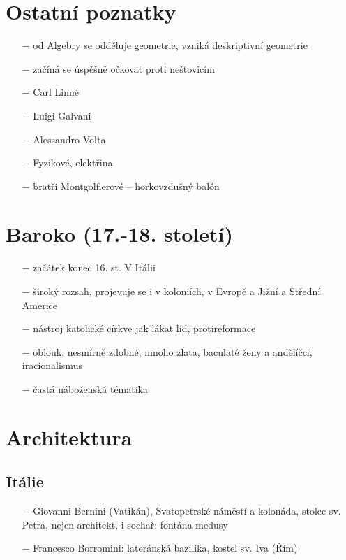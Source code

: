 \documentclass{article}
\begin{document}
\section*{Ostatní poznatky}
\begin{itemize}
    \vspace{-0.5em}
    \setlength\itemsep{0.15em}
    \item[$-$] od Algebry se odděluje geometrie, vzniká deskriptivní geometrie
    \item[$-$] začíná se úspěšně očkovat proti neštovicím
    \item[$-$] Carl Linné
    \item[$-$] Luigi Galvani
    \item[$-$] Alessandro Volta
    \item[$-$] Fyzikové, elektřina
    \item[$-$] bratři Montgolfierové – horkovzdušný balón

\end{itemize}

\section*{Baroko (17.-18. století)}
\begin{itemize}
    \vspace{-0.5em}
    \setlength\itemsep{0.15em}
  \item[$-$] začátek konec 16. st. V Itálii
  \item[$-$] široký rozsah, projevuje se i v koloniích, v Evropě a Jižní a Střední Americe
  \item[$-$] nástroj katolické církve jak lákat lid, protireformace
  \item[$-$] oblouk, nesmírně zdobné, mnoho zlata, baculaté ženy a andělíčci, iracionalismus
  \item[$-$] častá náboženská tématika

\end{itemize}

\section*{Architektura}
\subsection*{Itálie}

\begin{itemize}
    \vspace{-0.5em}
    \setlength\itemsep{0.15em}
    \item[$-$] Giovanni Bernini (Vatikán), Svatopetrské náměstí a kolonáda, stolec sv. Petra, nejen architekt, i sochař: fontána medusy
\item[$-$] Francesco Borromini: lateránská bazilika, kostel sv. Iva (Řím)
\end{itemize}
\end{document}
